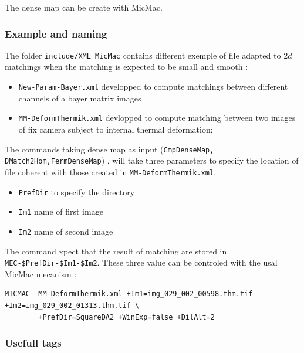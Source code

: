 The dense map can be create with MicMac.


\subsubsection{Example and naming}

The folder {\tt include/XML\_MicMac} contains different exemple of file
adapted to $2d$ matchings when the matching is expected to be small and smooth :

\begin{itemize}
   \item {\tt New-Param-Bayer.xml} developped to compute matchings between 
         different channels of a bayer matrix images

   \item {\tt MM-DeformThermik.xml} devlopped to compute matching between
         two images of fix camera subject to internal thermal deformation;
\end{itemize}

The commands taking dense map as input ({\tt CmpDenseMap, DMatch2Hom,FermDenseMap}) , will take three parameters to 
specify the location of file coherent with those created in {\tt MM-DeformThermik.xml}.

\begin{itemize}
    \item  {\tt PrefDir}  to specify the directory
    \item  {\tt Im1} name of first image
    \item  {\tt Im2} name of second image
\end{itemize}

The command xpect that the result of matching are stored in 
{\tt MEC-\${PrefDir}-\${Im1}-\${Im2}}.
These three value can be controled with the usal MicMac mecanism :

\begin{verbatim}
MICMAC  MM-DeformThermik.xml +Im1=img_029_002_00598.thm.tif +Im2=img_029_002_01313.thm.tif \
        +PrefDir=SquareDA2 +WinExp=false +DilAlt=2
\end{verbatim}



\subsubsection{Usefull tags}

